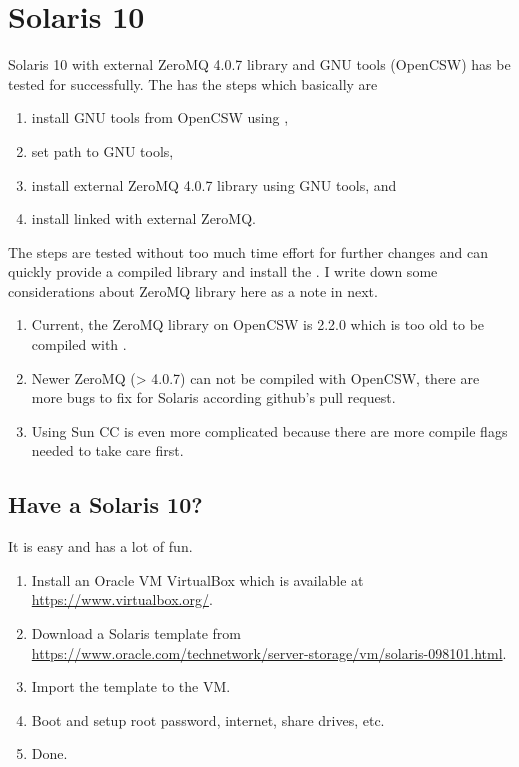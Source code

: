 \section[Solaris 10]{Solaris 10}
\label{sec:solaris_10}

Solaris 10 with external ZeroMQ 4.0.7 library and GNU tools (OpenCSW)
has be tested for  successfully. The 
has the steps which basically are
\begin{enumerate}
\item install GNU tools from OpenCSW using ,
\item set path to GNU tools,
\item install external ZeroMQ 4.0.7 library using GNU tools, and
\item install  linked with external ZeroMQ.
\end{enumerate}
The steps are tested without too much time effort for further changes and
can quickly provide a compiled library and install the .
I write down some considerations about ZeroMQ library here as a note in next.
\begin{enumerate}
\item Current, the ZeroMQ library on OpenCSW is 2.2.0 which is too old to
      be compiled with .
\item Newer ZeroMQ (> 4.0.7) can not be compiled with OpenCSW, there are
      more bugs to fix for Solaris according github's pull request.
\item Using Sun CC is even more complicated because there are more
      compile flags needed to take care first.
\end{enumerate}


\subsection[Have a Solaris 10?]{Have a Solaris 10?}
\label{sec:have_solaris_10}

It is easy and has a lot of fun.
\begin{enumerate}
\item
Install an Oracle VM VirtualBox which is available at
\url{https://www.virtualbox.org/}.
\item
Download a Solaris template from \\
\url{https://www.oracle.com/technetwork/server-storage/vm/solaris-098101.html}.
\item
Import the template to the VM.
\item
Boot and setup root password, internet, share drives, etc.
\item
Done.
\end{enumerate}

